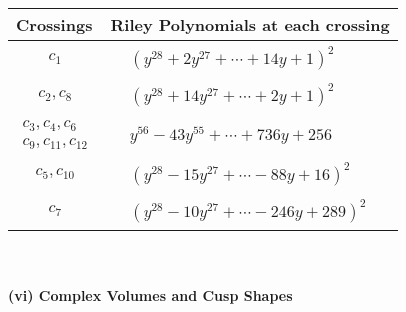\documentclass[1p]{elsarticle_modified}
\theoremstyle{definition}
\begin{document}
\begin{tabular}{m{50pt}|m{274pt}}
Crossings & \hspace{64pt}Riley Polynomials at each crossing \\
\hline $$\begin{aligned}c_{1}\end{aligned}$$&$\begin{aligned}
&(y^{28}+2 y^{27}+\cdots+14 y+1)^{2}
\end{aligned}$\\
\hline $$\begin{aligned}c_{2},c_{8}\end{aligned}$$&$\begin{aligned}
&(y^{28}+14 y^{27}+\cdots+2 y+1)^{2}
\end{aligned}$\\
\hline $$\begin{aligned}c_{3},c_{4},c_{6}\\c_{9},c_{11},c_{12}\end{aligned}$$&$\begin{aligned}
&y^{56}-43 y^{55}+\cdots+736 y+256
\end{aligned}$\\
\hline $$\begin{aligned}c_{5},c_{10}\end{aligned}$$&$\begin{aligned}
&(y^{28}-15 y^{27}+\cdots-88 y+16)^{2}
\end{aligned}$\\
\hline $$\begin{aligned}c_{7}\end{aligned}$$&$\begin{aligned}
&(y^{28}-10 y^{27}+\cdots-246 y+289)^{2}
\end{aligned}$\\
\hline
\end{tabular}\\~\\
\newpage\flushleft \textbf{(vi) Complex Volumes and Cusp Shapes}
\end{document}
